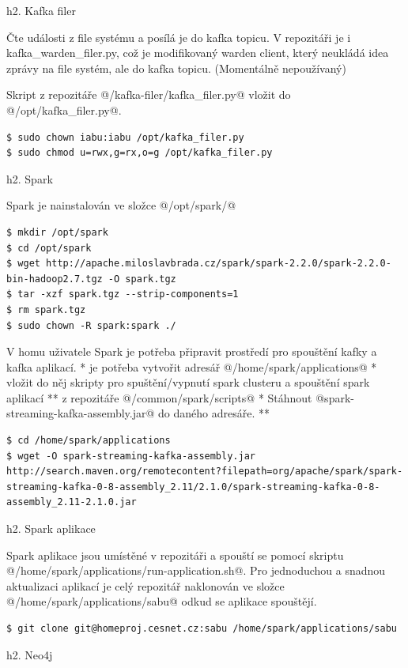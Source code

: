 \documentclass[a4paper]{article} %
\begin{document}
h2. Kafka filer

Čte události z file systému a posílá je do kafka topicu. 
V repozitáři je i kafka\_warden\_filer.py, což je modifikovaný warden client, který neukládá idea zprávy na file systém, ale do kafka topicu. (Momentálně nepoužívaný)

Skript z repozitáře @/kafka-filer/kafka\_filer.py@ vložit do @/opt/kafka\_filer.py@.

\begin{lstlisting}[]
$ sudo chown iabu:iabu /opt/kafka_filer.py
$ sudo chmod u=rwx,g=rx,o=g /opt/kafka_filer.py
\end{lstlisting}

h2. Spark

Spark je nainstalován ve složce @/opt/spark/@

\begin{lstlisting}[]
$ mkdir /opt/spark
$ cd /opt/spark
$ wget http://apache.miloslavbrada.cz/spark/spark-2.2.0/spark-2.2.0-bin-hadoop2.7.tgz -O spark.tgz
$ tar -xzf spark.tgz --strip-components=1
$ rm spark.tgz
$ sudo chown -R spark:spark ./
\end{lstlisting}

V homu uživatele Spark je potřeba připravit prostředí pro spouštění kafky a kafka aplikací.
* je potřeba vytvořit adresář @/home/spark/applications@
* vložit do něj skripty pro spuštění/vypnutí spark clusteru a spouštění spark aplikací
** z repozitáře @/common/spark/scripts@
* Stáhnout @spark-streaming-kafka-assembly.jar@ do daného adresáře.
** \begin{lstlisting}[]
$ cd /home/spark/applications
$ wget -O spark-streaming-kafka-assembly.jar http://search.maven.org/remotecontent?filepath=org/apache/spark/spark-streaming-kafka-0-8-assembly_2.11/2.1.0/spark-streaming-kafka-0-8-assembly_2.11-2.1.0.jar
\end{lstlisting}

h2. Spark aplikace

Spark aplikace jsou umístěné v repozitáři a spouští se pomocí skriptu @/home/spark/applications/run-application.sh@.
Pro jednoduchou a snadnou aktualizaci aplikací je celý repozitář naklonován ve složce @/home/spark/applications/sabu@ odkud se aplikace spouštějí.

\begin{lstlisting}[]
$ git clone git@homeproj.cesnet.cz:sabu /home/spark/applications/sabu
\end{lstlisting}

h2. Neo4j
\end{document}
